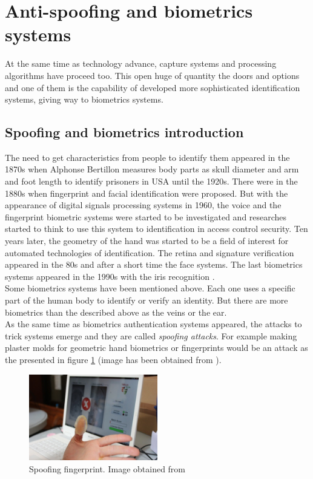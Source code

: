 \section{Anti-spoofing and biometrics systems}
At the same time as technology advance, capture systems and processing algorithms have proceed too. This open huge of quantity the doors and options and one of them is the capability of developed more sophisticated identification systems, giving way to biometrics systems.\\

\subsection{Spoofing and biometrics introduction}
The need to get characteristics from people to identify them appeared in the 1870s when Alphonse Bertillon measures body parts as skull diameter and arm and foot length to identify prisoners in USA until the 1920s. There were in the 1880s when fingerprint and facial identification were proposed. But with the appearance of digital signals processing systems in 1960, the voice and the fingerprint biometric systems were started to be investigated and researches started to think to use this system to identification in access control security. Ten years later, the geometry of the hand was started to be a field of interest for automated technologies of identification. The retina and signature verification appeared in the 80s and after a short time the face systems. The last biometrics systems appeared in the 1990s with the iris recognition \cite{Intro_biometrics}.\\

Some biometrics systems have been mentioned above. Each one uses a specific part of the human body to identify or verify an identity. But there are more biometrics than the described above as the veins or the ear.\\

As the same time as biometrics authentication systems appeared, the attacks to trick systems emerge and they are called \textit{spoofing attacks}. For example making plaster molds for geometric hand biometrics or fingerprints would be an attack as the presented in figure \ref{fig:Spoof_fingerprint} (image has been obtained from \cite{fingerprint_image}).\\


\begin{figure}[htb]
\centering
\includegraphics[width=0.5\textwidth]{images_miscelaneus/spoofing_fingerprint.jpg}
\caption{Spoofing fingerprint. Image obtained from \cite{fingerprint_image}} \label{fig:Spoof_fingerprint}
\end{figure}

